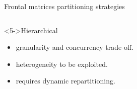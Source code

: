 \begin{frame}{Frontal matrices partitioning strategies}
\begin{columns}
\begin{column}{0.7\textwidth}

      \vspace{0.3cm}

      \begin{block}<5->{Hierarchical}
        \begin{itemize}
        \item<7->[\dg{$\blacktriangle$}]  granularity and concurrency trade-off. 
        \item<7->[\dg{$\blacktriangle$}]  heterogeneity to be exploited.
        \item<8> requires \alert{dynamic repartitioning}.

        \end{itemize}
      \end{block}


\end{column}
\end{columns}
\end{frame}
